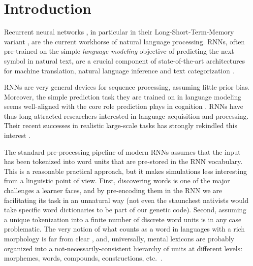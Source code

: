 \section{Introduction}
\label{sec:introduction}

Recurrent neural networks \cite[RNNs,][]{Elman:1990}, in particular
in their Long-Short-Term-Memory variant
\cite[LSTMs,][]{Hochreiter:Schmidhuber:1997}, are the current
workhorse of natural language processing. RNNs, often
pre-trained on the simple \emph{language modeling} objective of
predicting the next symbol in natural text, are a crucial
component of state-of-the-art architectures for machine
translation, natural language inference and text categorization
\cite{Goldberg:2017}.

RNNs are very general devices for sequence processing, assuming little
prior bias. Moreover, the simple prediction task they are trained on
in language modeling seems well-aligned with the core role prediction
plays in cognition \cite[e.g.,][]{Bar:2007,Clark:2016}. RNNs have thus
long attracted researchers
interested in language acquisition and processing. Their recent successes in
realistic large-scale tasks has strongly rekindled this interest
\cite[see, e.g.,][and references there]{Frank:etal:2013,Lau:etal:2017,Kirov:Cotterell:2018,McCoy:etal:2018,Pater:2018}.

The standard pre-processing pipeline of modern RNNs assumes that the
input has been tokenized into word units that are pre-stored in the
RNN vocabulary. This is a reasonable practical approach, but it makes
simulations less interesting from a linguistic point of view. First,
discovering words is one of the major challenges a learner faces, and
by pre-encoding them in the RNN we are facilitating its task in an
unnatural way (not even the staunchest nativists would take specific
word dictionaries to be part of our genetic code). Second, assuming a
unique tokenization into a finite number of discrete word units is in
any case problematic. The very notion of what counts as a word in
languages with a rich morphology is far from clear
\cite[e.g.,][]{Bickel:Zuniga:2017}, and, universally, mental lexicons
are probably organized into a not-necessarily-consistent hierarchy of
units at different levels: morphemes, words, compounds, constructions,
etc.~\cite[e.g.,][]{Goldberg:2005}.

